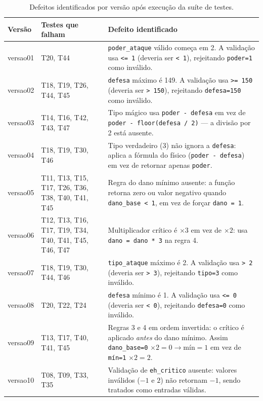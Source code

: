 \documentclass[conference, onecolumn]{IEEEtran}
\begin{document}
\begin{table}[H]
\centering
\caption{Defeitos identificados por versão após execução da suíte de testes.}
\label{tab:defeitos}
\begin{tabular}{@{}p{1.3cm}p{2.8cm}p{7.5cm}@{}}
\toprule
\textbf{Versão} & \textbf{Testes que falham} & \textbf{Defeito identificado} \\
\midrule
versao01 & T20, T44 &
    \texttt{poder\_ataque} válido começa em 2. A validação usa \texttt{<= 1}
    (deveria ser \texttt{< 1}), rejeitando \texttt{poder=1} como inválido. \\
\midrule
versao02 & T18, T19, T26, T44, T45 &
    \texttt{defesa} máximo é 149. A validação usa \texttt{>= 150}
    (deveria ser \texttt{> 150}), rejeitando \texttt{defesa=150} como inválido. \\
\midrule
versao03 & T14, T16, T42, T43, T47 &
    Tipo mágico usa \texttt{poder - defesa} em vez de
    \texttt{poder - floor(defesa / 2)} — a divisão por 2 está ausente. \\
\midrule
versao04 & T18, T19, T30, T46 &
    Tipo verdadeiro (3) não ignora a \texttt{defesa}: aplica a fórmula do
    físico (\texttt{poder - defesa}) em vez de retornar apenas \texttt{poder}. \\
\midrule
versao05 & T11, T13, T15, T17, T26, T36, T38, T40, T41, T45 &
    Regra do dano mínimo ausente: a função retorna zero ou valor negativo
    quando \texttt{dano\_base < 1}, em vez de forçar \texttt{dano = 1}. \\
\midrule
versao06 & T12, T13, T16, T17, T19, T34, T40, T41, T45, T46, T47 &
    Multiplicador crítico é $\times 3$ em vez de $\times 2$: usa
    \texttt{dano = dano * 3} na regra 4. \\
\midrule
versao07 & T18, T19, T30, T44, T46 &
    \texttt{tipo\_ataque} máximo é 2. A validação usa \texttt{> 2}
    (deveria ser \texttt{> 3}), rejeitando \texttt{tipo=3} como inválido. \\
\midrule
versao08 & T20, T22, T24 &
    \texttt{defesa} mínimo é 1. A validação usa \texttt{<= 0}
    (deveria ser \texttt{< 0}), rejeitando \texttt{defesa=0} como inválido. \\
\midrule
versao09 & T13, T17, T40, T41, T45 &
    Regras 3 e 4 em ordem invertida: o crítico é aplicado \textit{antes} do
    dano mínimo. Assim \texttt{dano\_base=0} $\times 2 = 0 \to \text{mín} = 1$
    em vez de \texttt{mín=1} $\times 2 = 2$. \\
\midrule
versao10 & T08, T09, T33, T35 &
    Validação de \texttt{eh\_critico} ausente: valores inválidos ($-1$ e $2$)
    não retornam $-1$, sendo tratados como entradas válidas. \\
\bottomrule
\end{tabular}
\end{table}
\end{document}

